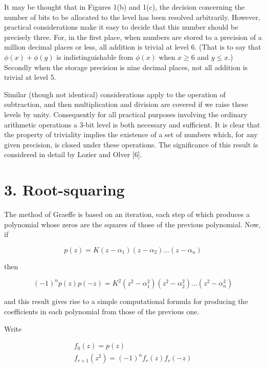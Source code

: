 \documentclass[10pt]{article}
\begin{document}
It may be thought that in Figures 1(b) and 1(c), the decision concerning the number of bits to be allocated to the level has been resolved arbitrarily. However, practical considerations make it easy to decide that this number should be precisely three. For, in the first place, when numbers are stored to a precision of a million decimal places or less, all addition is trivial at level 6. (That is to say that $\phi(x)+\phi(y)$ is indistinguishable from $\phi(x)$ when $x \geq 6$ and $y \leq x$.) Secondly when the storage precision is nine decimal places, not all addition is trivial at level 5.

Similar (though not identical) considerations apply to the operation of subtraction, and then multiplication and division are covered if we raise these levels by unity. Consequently for all practical purposes involving the ordinary arithmetic operations a 3-bit level is both necessary and sufficient. It is clear that the property of triviality implies the existence of a set of numbers which, for any given precision, is closed under these operations. The significance of this result is considered in detail by Lozier and Olver [6].

\section*{3. Root-squaring}
The method of Graeffe is based on an iteration, each step of which produces a polynomial whose zeros are the squares of those of the previous polynomial. Now, if


\begin{equation*}
p(z)=K\left(z-\alpha_{1}\right)\left(z-\alpha_{2}\right) \ldots\left(z-\alpha_{n}\right) \tag{3.1}
\end{equation*}


then


\begin{equation*}
(-1)^{n} p(z) p(-z)=K^{2}\left(z^{2}-\alpha_{1}^{2}\right)\left(z^{2}-\alpha_{2}^{2}\right) \ldots\left(z^{2}-\alpha_{n}^{2}\right) \tag{3.2}
\end{equation*}


and this result gives rise to a simple computational formula for producing the coefficients in each polynomial from those of the previous one.

Write


\begin{gather*}
f_{0}(z)=p(z)  \tag{3.3}\\
f_{r+1}\left(z^{2}\right)=(-1)^{n} f_{r}(z) f_{r}(-z) \tag{3.4}
\end{gather*}
\end{document}
